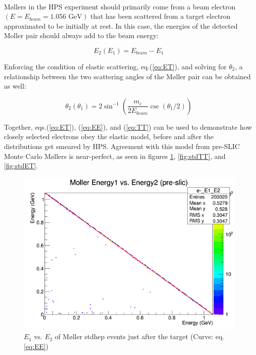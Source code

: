\documentclass{article}
\begin{document}
	\paragraph{}
	M\o llers in the HPS experiment should primarily come from a beam electron $\left(E=E_{beam}=\mbox{1.056 GeV}\right)$ that has been scattered from a target electron approximated to be initially at rest. In this case, the energies of the detected Moller pair should always add to the beam energy:

	 \begin{equation} \label{eq:EE}
  	E_2(E_1) = E_{beam} - E_1
	\end{equation}\newline 
	
	Enforcing the condition of elastic scattering, eq.(\ref{eq:ET}), and solving for $\theta_2$, a relationship between the two scattering angles of the M\o ller pair can be obtained as well:

	 \begin{equation} \label{eq:TT}
  	\theta_2(\theta_1) = 2\sin^{-1}{\left(\frac{m_e}{2E_{beam}}\csc{\left(\theta_1/2\right)}\right)}
	\end{equation}\newline 

	Together, eqs.(\ref{eq:ET}), (\ref{eq:EE}), and (\ref{eq:TT}) can be used to demonstrate how closely selected electrons obey the elastic model, before and after the distributions get smeared by HPS. Agreement with this model from pre-SLIC Monte Carlo M\o llers is near-perfect, as seen in figures \ref{fig:stdEE}, \ref{fig:stdTT}, and \ref{fig:stdET}.
	
	\begin{figure}[H]
  	\includegraphics[width=\linewidth]{old/stdEE.png}
  	\caption{$E_1$ vs. $E_2$ of M\o ller stdhep events just after the target (Curve: eq.\ref{eq:EE})}
  	\label{fig:stdEE}
	\end{figure}
	
\end{document}
